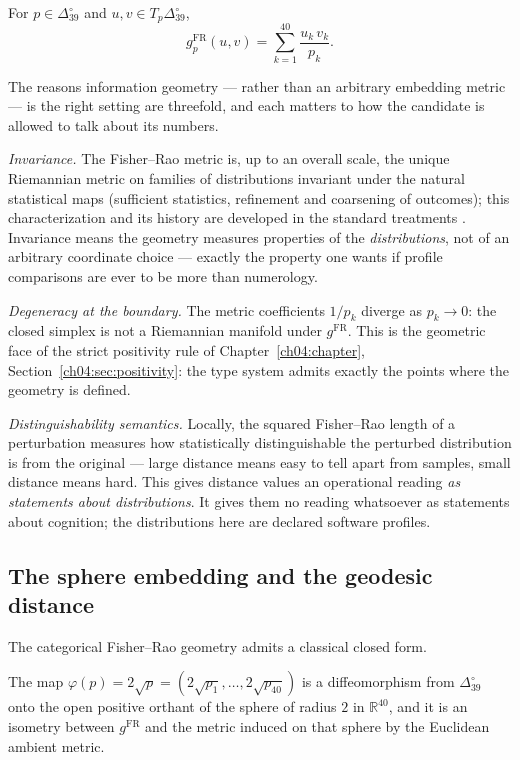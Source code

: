 \begin{definition}
\label{ch06:def:frmetric}
For $p \in \Delta_{39}^{\circ}$ and
$u, v \in T_p \Delta_{39}^{\circ}$,
\[
g^{\mathrm{FR}}_p(u, v) = \sum_{k=1}^{40} \frac{u_k\, v_k}{p_k}.
\]
\end{definition}

The reasons information geometry --- rather than an arbitrary embedding
metric --- is the right setting are threefold, and each matters to how
the candidate is allowed to talk about its numbers.

\emph{Invariance.} The Fisher--Rao metric is, up to an overall scale,
the unique Riemannian metric on families of distributions invariant
under the natural statistical maps (sufficient statistics, refinement
and coarsening of outcomes); this characterization and its history are
developed in the standard treatments \cite{amari,ay}. Invariance means
the geometry measures properties of the \emph{distributions}, not of an
arbitrary coordinate choice --- exactly the property one wants if
profile comparisons are ever to be more than numerology.

\emph{Degeneracy at the boundary.} The metric coefficients $1/p_k$
diverge as $p_k \to 0$: the closed simplex is not a Riemannian manifold
under $g^{\mathrm{FR}}$. This is the geometric face of the strict
positivity rule of Chapter~\ref{ch04:chapter},
Section~\ref{ch04:sec:positivity}: the type system admits exactly the
points where the geometry is defined.

\emph{Distinguishability semantics.} Locally, the squared Fisher--Rao
length of a perturbation measures how statistically distinguishable the
perturbed distribution is from the original --- large distance means
easy to tell apart from samples, small distance means hard. This gives
distance values an operational reading \emph{as statements about
distributions}. It gives them no reading whatsoever as statements about
cognition; the distributions here are declared software profiles.

\subsection{The sphere embedding and the geodesic distance}

The categorical Fisher--Rao geometry admits a classical closed form.

\begin{proposition}\label{ch06:prop:sphere}
The map $\varphi(p) = 2\sqrt{p} = (2\sqrt{p_1}, \ldots, 2\sqrt{p_{40}})$
is a diffeomorphism from $\Delta_{39}^{\circ}$ onto the open positive
orthant of the sphere of radius $2$ in $\mathbb{R}^{40}$, and it is an
isometry between $g^{\mathrm{FR}}$ and the metric induced on that sphere
by the Euclidean ambient metric.
\end{proposition}


